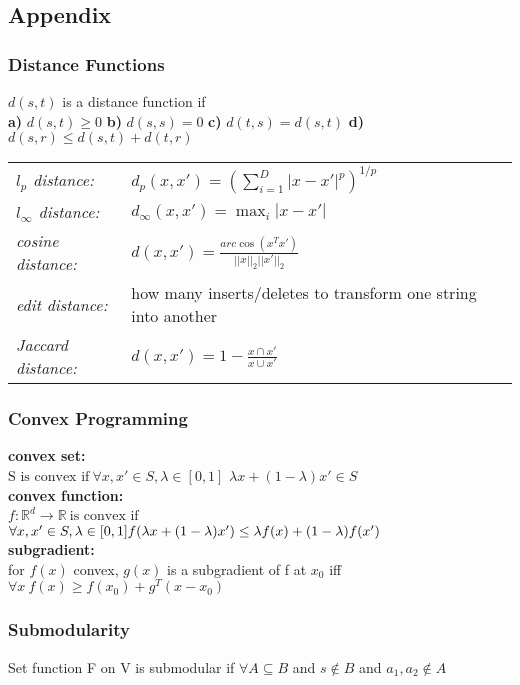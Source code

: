 \documentclass[10pt,parskip]{scrartcl}
\begin{document}
\begin{multicols*}{3}
\subsection{Appendix}
\subsubsection{Distance Functions} %
\label{ssub:distance_functions}
$d(s,t)$ is a distance function if \\
\textbf{a)} $d(s,t) \geq 0$ \textbf{b)} $d(s,s) = 0$ 
\textbf{c)} $d(t,s) = d(s,t)$ \textbf{d)} $d(s,r) \leq d(s,t) + d(t,r)$\\
	\begin{tabular} {l p{6cm}}
		\emph{$l_p$ distance:} & $d_p(x,x') = (\sum_{i=1}^D |x-x'|^p)^{1/p}$ \\
		\emph{$l_\infty$ distance:} & $d_\infty(x,x') = \max_i |x-x'|$ \\
		\emph{cosine distance:} & $d(x,x') = \frac{arc\cos(x^T x')}{||x||_2||x'||_2}$ \\
		\emph{edit distance:} & how many inserts/deletes to transform one string into another \\
		\emph{Jaccard distance: } & $d(x,x') =  1- \frac{x \cap x'}{x \cup x'}$ 
	\end{tabular}

\subsubsection{Convex Programming} %
\label{ssub:convex_programming}
\textbf{convex set:}\\
$\textrm{S is convex if} \ \forall x, x' \in S , \lambda \in [0,1]$
$\lambda x + (1- \lambda) x' \in S $ \\
\textbf{convex function:}\\
$f:\mathbb{R}^d \to \mathbb{R} \ \textrm{is convex if}$ \  
$\forall x, x' \in S , \lambda \in [0,1] \\
f(\lambda x + (1-\lambda)x') \leq \lambda f(x) + (1-\lambda) f(x')$ \\
\textbf{subgradient:}\\
for $f(x)$ convex, $g(x)$ is a subgradient of f at $x_0$ iff \\
$\forall x \ f(x) \geq f(x_0) + g^T(x-x_0)$

\subsubsection{Submodularity} %
\label{ssub:submodularity}
Set function F on V is submodular if $\forall A \subseteq B$ and $s \notin B$ and $a_1,a_2 \notin A$


\end{multicols*}
\end{document}
